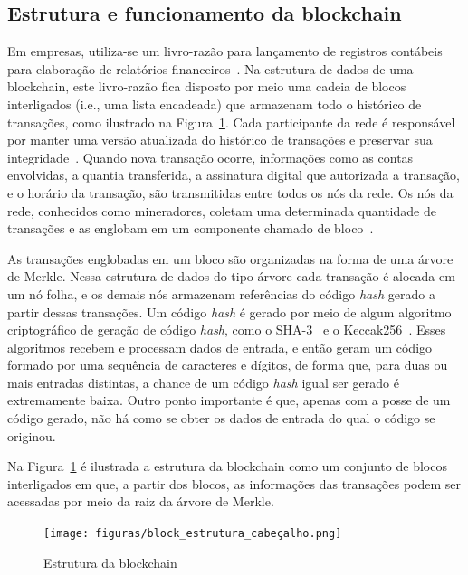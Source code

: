 \subsection{Estrutura e funcionamento da blockchain} \label{tex:fund:blockchain:estrutura}

Em empresas, utiliza-se um livro-razão para lançamento de registros contábeis para elaboração de relatórios financeiros~\cite{marion1985contabilidade}. Na estrutura de dados de uma blockchain, este livro-razão fica disposto por meio uma cadeia de blocos interligados (i.e., uma lista encadeada) que armazenam todo o histórico de transações, como ilustrado na Figura~\ref{fig:blockchain_estrutura}. Cada participante da rede é responsável por manter uma versão atualizada do histórico de transações e preservar sua integridade~\cite{overview-blockchainbasic2018drescher}. Quando nova transação ocorre, informações como as contas envolvidas, a quantia transferida, a assinatura digital que autorizada a transação, e o horário da transação, são transmitidas entre todos os nós da rede. Os nós da rede, conhecidos como mineradores, coletam uma determinada quantidade de transações e as englobam em um componente chamado de bloco~\cite{overview-blockchainbasic2018drescher}. 

As transações englobadas em um bloco são organizadas na forma de uma árvore de Merkle. Nessa estrutura de dados do tipo árvore cada transação é alocada em um nó folha, e os demais nós armazenam referências do código \textit{hash} gerado a partir dessas transações. Um código \textit{hash} é gerado por meio de algum algoritmo criptográfico de geração de código \textit{hash}, como o SHA-3~\cite{dworkin2015sha3} e o Keccak256~\cite{bertoni2020keccak}. Esses algoritmos recebem e processam dados de entrada, e então geram um código formado por uma sequência de caracteres e dígitos, de forma que, para duas ou mais entradas distintas, a chance de um código \textit{hash} igual ser gerado é extremamente baixa. Outro ponto importante é que, apenas com a posse de um código gerado, não há como se obter os dados de entrada do qual o código se originou.

Na Figura~\ref{fig:blockchain_estrutura} é ilustrada a estrutura da blockchain como um conjunto de blocos interligados em que, a partir dos blocos, as informações das transações podem ser acessadas por meio da raiz da árvore de Merkle. 

\begin{figure}[htb]
 \caption{Estrutura da blockchain}
 \label{fig:blockchain_estrutura}
 \centering
 \texttt{[image: figuras/block\_estrutura\_cabeçalho.png]}
\end{figure}

